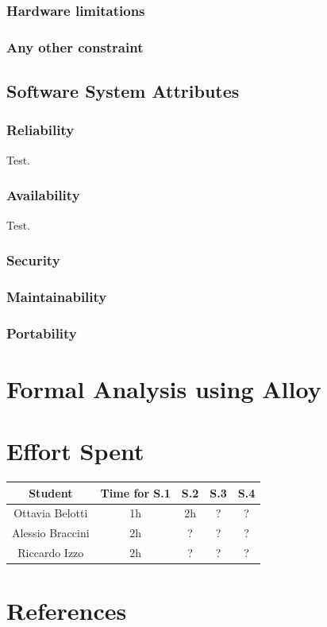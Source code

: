 \documentclass[table, 12pt]{article}
\begin{document}
\subsubsection{Hardware limitations}
\subsubsection{Any other constraint}

\subsection{Software System Attributes}
\subsubsection{Reliability}
Test.

\subsubsection{Availability}
Test.

\subsubsection{Security}
\subsubsection{Maintainability}
\subsubsection{Portability}

\section{Formal Analysis using Alloy}
\section{Effort Spent}
    \begin{tabular}{| c || c | c| c| c |}
        \hline
        Student & Time for S.1 & S.2 & S.3 & S.4 \\ \hline
        Ottavia Belotti & 1h & 2h & ? & ? \\
        Alessio Braccini & 2h & ? & ? & ? \\
        Riccardo Izzo & 2h & ? & ? & ? \\
        \hline
    \end{tabular}

\section{References}
\end{document}
